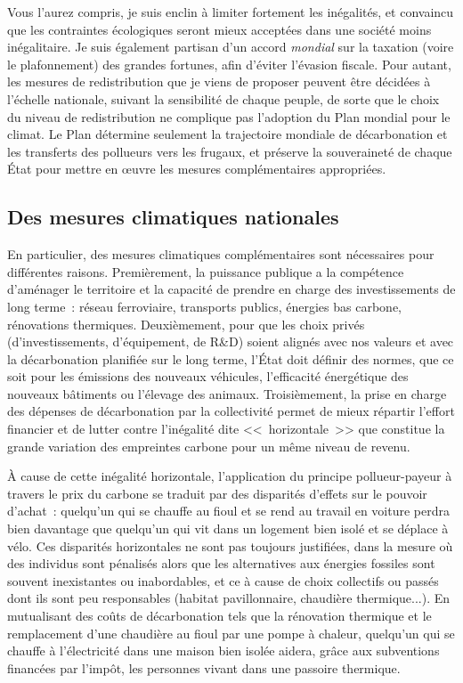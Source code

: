 \documentclass[a5paper,french,openany]{memoir}
\begin{document}
Vous l'aurez compris, je suis enclin à limiter fortement les inégalités, et convaincu que les contraintes écologiques seront mieux acceptées dans une société moins inégalitaire. Je suis également partisan d'un accord \textit{mondial} sur la taxation (voire le plafonnement) des grandes fortunes, afin d'éviter l'évasion fiscale. Pour autant, les mesures de redistribution que je viens de proposer peuvent être décidées à l'échelle nationale, suivant la sensibilité de chaque peuple, de sorte que le choix du niveau de redistribution ne complique pas l'adoption du Plan mondial pour le climat. Le Plan détermine seulement la trajectoire mondiale de décarbonation et les transferts des pollueurs vers les frugaux, et préserve la souveraineté de chaque État pour mettre en œuvre les mesures complémentaires appropriées.

\subsection{Des mesures climatiques nationales} %

En particulier, des mesures climatiques complémentaires sont nécessaires pour différentes raisons. Premièrement, la puissance publique a la compétence d'aménager le territoire et la capacité de prendre en charge des investissements de long terme~: réseau ferroviaire, transports publics, énergies bas carbone, rénovations thermiques. Deuxièmement, pour que les choix privés (d'investissements, d'équipement, de R\&D) soient alignés avec nos valeurs et avec la décarbonation planifiée sur le long terme, l'État doit définir des normes, que ce soit pour les émissions des nouveaux véhicules, l'efficacité énergétique des nouveaux bâtiments ou l'élevage des animaux. %
Troisièmement, la prise en charge des dépenses de décarbonation par la collectivité permet de mieux répartir l'effort financier et de lutter contre l'inégalité dite <<~horizontale~>> que constitue la grande variation des empreintes carbone pour un même niveau de revenu. %

À cause de cette inégalité horizontale, l'application du principe pollueur-payeur à travers le prix du carbone se traduit par des disparités d'effets sur le pouvoir d'achat~: quelqu'un qui se chauffe au fioul et se rend au travail en voiture perdra bien davantage que quelqu'un qui vit dans un logement bien isolé et se déplace à vélo. 
Ces disparités horizontales ne sont pas toujours justifiées, dans la mesure où des individus sont pénalisés alors que les alternatives aux énergies fossiles sont souvent inexistantes ou inabordables, et ce à cause de choix collectifs ou passés dont ils sont peu responsables (habitat pavillonnaire, chaudière thermique...). En mutualisant des coûts de décarbonation tels que la rénovation thermique et le remplacement d'une chaudière au fioul par une pompe à chaleur, quelqu'un qui se chauffe à l'électricité dans une maison bien isolée aidera, grâce aux subventions financées par l'impôt, les personnes vivant dans une passoire thermique. 
\end{document}
